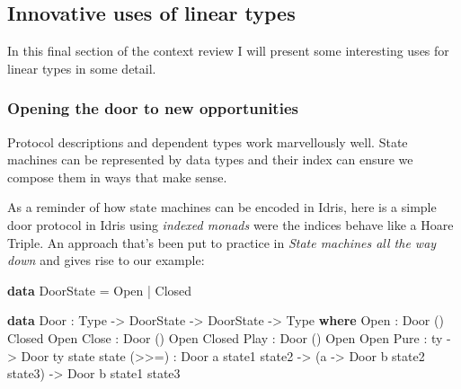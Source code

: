\documentclass[
]{article}
\newenvironment{Shaded}{}{}
\newcommand{\DataTypeTok}[1]{\textcolor[rgb]{0.56,0.13,0.00}{#1}}
\newcommand{\KeywordTok}[1]{\textcolor[rgb]{0.00,0.44,0.13}{\textbf{#1}}}
\newcommand{\NormalTok}[1]{#1}
\newcommand{\OperatorTok}[1]{\textcolor[rgb]{0.40,0.40,0.40}{#1}}
\newcommand{\OtherTok}[1]{\textcolor[rgb]{0.00,0.44,0.13}{#1}}
\begin{document}
\hypertarget{innovative-uses-of-linear-types}{%
\subsection{Innovative uses of linear
types}\label{innovative-uses-of-linear-types}}

In this final section of the context review I will present some
interesting uses for linear types in some detail.

\hypertarget{opening-the-door-to-new-opportunities}{%
\subsubsection{Opening the door to new
opportunities}\label{opening-the-door-to-new-opportunities}}

Protocol descriptions and dependent types work marvellously well. State
machines can be represented by data types and their index can ensure we
compose them in ways that make sense.

As a reminder of how state machines can be encoded in Idris, here is a
simple door protocol in Idris using \emph{indexed monads}
\cite{parameterised_computation} were the indices behave like a Hoare
Triple. An approach that's been put to practice in \emph{State machines
all the way down}\cite{state_machines} and gives rise to our example:

\begin{Shaded}
\begin{Highlighting}[]
\KeywordTok{data} \DataTypeTok{DoorState} \OtherTok{=} \DataTypeTok{Open} \OperatorTok{|} \DataTypeTok{Closed}

\KeywordTok{data} \DataTypeTok{Door} \OperatorTok{:} \DataTypeTok{Type} \OtherTok{{-}\textgreater{}} \DataTypeTok{DoorState} \OtherTok{{-}\textgreater{}} \DataTypeTok{DoorState} \OtherTok{{-}\textgreater{}} \DataTypeTok{Type} \KeywordTok{where} 
    \DataTypeTok{Open} \OperatorTok{:} \DataTypeTok{Door}\NormalTok{ () }\DataTypeTok{Closed} \DataTypeTok{Open}
    \DataTypeTok{Close} \OperatorTok{:} \DataTypeTok{Door}\NormalTok{ () }\DataTypeTok{Open} \DataTypeTok{Closed}
    \DataTypeTok{Play} \OperatorTok{:} \DataTypeTok{Door}\NormalTok{ () }\DataTypeTok{Open} \DataTypeTok{Open}
    \DataTypeTok{Pure} \OperatorTok{:}\NormalTok{ ty }\OtherTok{{-}\textgreater{}} \DataTypeTok{Door}\NormalTok{ ty state state}
\NormalTok{    (}\OperatorTok{\textgreater{}\textgreater{}=}\NormalTok{) }\OperatorTok{:} \DataTypeTok{Door}\NormalTok{ a state1 state2 }\OtherTok{{-}\textgreater{}}
\NormalTok{             (a }\OtherTok{{-}\textgreater{}} \DataTypeTok{Door}\NormalTok{ b state2 state3) }\OtherTok{{-}\textgreater{}}
             \DataTypeTok{Door}\NormalTok{ b state1 state3}
\end{Highlighting}
\end{Shaded}
\end{document}
